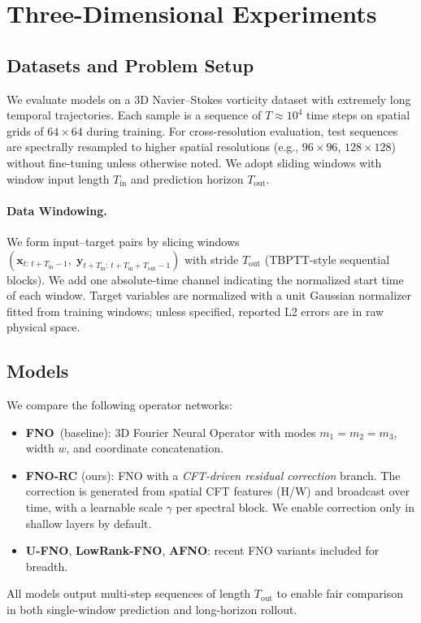 \section{Three-Dimensional Experiments}

\subsection{Datasets and Problem Setup}
We evaluate models on a 3D Navier--Stokes vorticity dataset with extremely long temporal trajectories. Each sample is a sequence of $T\!\approx\!10^4$ time steps on spatial grids of $64\times 64$ during training. For cross-resolution evaluation, test sequences are spectrally resampled to higher spatial resolutions (e.g., $96\times 96$, $128\times 128$) without fine-tuning unless otherwise noted. We adopt sliding windows with window input length $T_{\text{in}}$ and prediction horizon $T_{\text{out}}$.

\paragraph{Data Windowing.} We form input--target pairs by slicing windows $(\mathbf{x}_{t\!:\,t+T_{\text{in}}-1},\;\mathbf{y}_{t+T_{\text{in}}\!:\,t+T_{\text{in}}+T_{\text{out}}-1})$ with stride $T_{\text{out}}$ (TBPTT-style sequential blocks). We add one absolute-time channel indicating the normalized start time of each window. Target variables are normalized with a unit Gaussian normalizer fitted from training windows; unless specified, reported L2 errors are in raw physical space.

\subsection{Models}
We compare the following operator networks:
\begin{itemize}
  \item \textbf{FNO}~(baseline): 3D Fourier Neural Operator with modes $m_1\!=\!m_2\!=\!m_3$, width $w$, and coordinate concatenation.
  \item \textbf{FNO-RC} (ours): FNO with a \emph{CFT-driven residual correction} branch. The correction is generated from spatial CFT features (H/W) and broadcast over time, with a learnable scale $\gamma$ per spectral block. We enable correction only in shallow layers by default.
  \item \textbf{U-FNO}, \textbf{LowRank-FNO}, \textbf{AFNO}: recent FNO variants included for breadth.
\end{itemize}
All models output multi-step sequences of length $T_{\text{out}}$ to enable fair comparison in both single-window prediction and long-horizon rollout.

